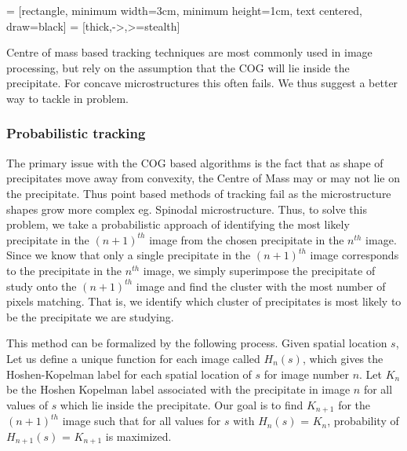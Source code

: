 \documentclass[12pt, a4paper]{report}
\begin{document}
\usetikzlibrary{shapes.geometric, arrows}
 = [rectangle, minimum width=3cm, minimum height=1cm, text centered, draw=black]
 = [thick,->,>=stealth]
\begin{center}
\end{center}

Centre of mass based tracking techniques are most commonly used in image processing, but rely on the assumption that the COG will lie inside the precipitate. For concave microstructures this often fails. We thus suggest a better way to tackle in problem.

\subsubsection{Probabilistic tracking}
The primary issue with the COG based algorithms is the fact that as shape of precipitates move away from convexity, the Centre of Mass may or may not lie on the precipitate. Thus point based methods of tracking fail as the microstructure shapes grow more complex eg. Spinodal microstructure. Thus, to solve this problem, we take a probabilistic approach of identifying the most likely precipitate in the ${(n+1)}^{th}$ image from the chosen precipitate in the $n^{th}$ image. Since we know that only a single precipitate in the ${(n+1)}^{th}$ image corresponds to the precipitate in the $n^{th}$ image, we simply superimpose the precipitate of study onto the ${(n+1)}^{th}$ image and find the cluster with the most number of pixels matching. That is, we identify which cluster of precipitates is most likely to be the precipitate we are studying.

\BlankLine

This method can be formalized by the following process.
Given spatial location $s$,
\BlankLine
Let us define a unique function for each image called $H_n(s)$, which gives the Hoshen-Kopelman label for each spatial location of $s$ for image number $n$.
\BlankLine
Let $K_n$ be the Hoshen Kopelman label associated with the precipitate in image $n$ for all values of $s$ which lie inside the precipitate.
\BlankLine
Our goal is to find $K_{n+1}$ for the ${(n+1)}^{th}$ image such that for all values for $s$ with $H_n(s)$ = $K_n$, probability of $H_{n+1}(s)$ = $K_{n+1}$ is maximized.
\BlankLine
\end{document}
